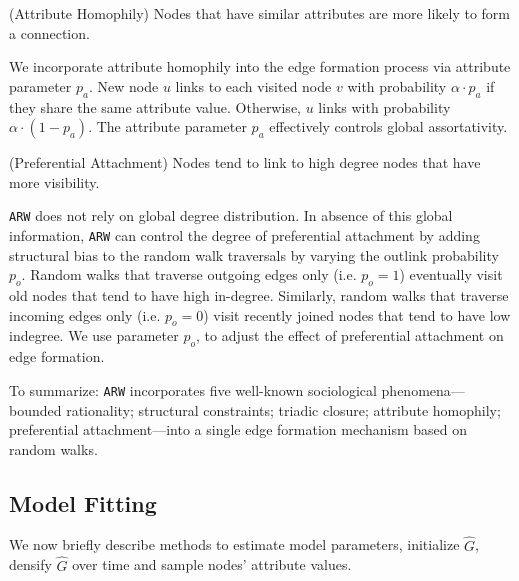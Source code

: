 \begin{ph}
	(Attribute Homophily) Nodes that have similar attributes are more likely
	to form a connection. \cite{mcpherson2001birds}
\end{ph}
We incorporate attribute homophily into the edge formation process via attribute parameter $p_a$. New node
$u$ links to each visited node $v$ with probability $\alpha \cdot p_a$ if they share
the same attribute value. Otherwise, $u$ links with probability $\alpha \cdot (1-p_a)$.
The attribute parameter $p_a$ effectively controls global assortativity.

\begin{ph}
	(Preferential Attachment) Nodes tend to link to high degree nodes that have more
	visibility. \cite{barabasi1999emergence}
\end{ph}
\texttt{ARW} does not rely on global degree distribution. In absence of this global information, \texttt{ARW} can control the degree of preferential attachment by adding structural bias to the random walk traversals by varying the outlink probability $p_o$. Random walks that traverse outgoing edges only (i.e. $p_o =1$) eventually visit old nodes that tend to have high in-degree. Similarly, random walks that traverse incoming edges only (i.e. $p_o=0$) visit recently joined nodes that tend to have low indegree. We use parameter $p_o$, to adjust the effect of preferential attachment on edge formation.

To summarize: \texttt{ARW} incorporates five well-known sociological phenomena---bounded rationality; structural constraints; triadic closure; attribute homophily; preferential attachment---into a single edge
formation mechanism based on random walks.




\subsection{Model Fitting}
\label{sub:Model Fitting}

We now briefly describe methods to estimate model parameters,
initialize $\hat{G}$, densify $\hat{G}$ over time and sample nodes' attribute values.

